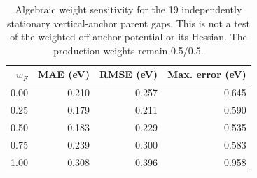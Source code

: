 \begin{table}[htbp]\centering\small
\caption{Algebraic weight sensitivity for the 19 independently stationary vertical-anchor parent gaps. This is not a test of the weighted off-anchor potential or its Hessian. The production weights remain 0.5/0.5.}
\begin{tabular}{rrrr}\toprule $w_F$ & MAE (eV) & RMSE (eV) & Max. error (eV)\\\midrule
0.00 & 0.210 & 0.257 & 0.645 \\
0.25 & 0.179 & 0.211 & 0.590 \\
0.50 & 0.183 & 0.229 & 0.535 \\
0.75 & 0.239 & 0.300 & 0.583 \\
1.00 & 0.308 & 0.396 & 0.958 \\
\bottomrule\end{tabular}\end{table}
